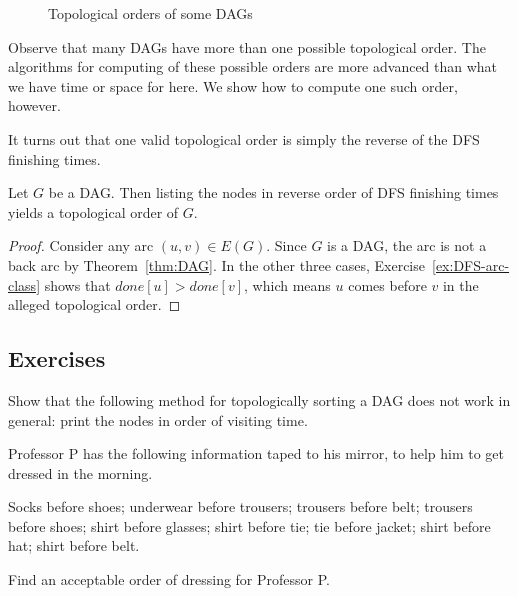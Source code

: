 \begin{figure}

\label{fig:toporder}



\centerline{}

\caption{Topological orders of some DAGs}
\end{figure}

Observe that many DAGs have more than one possible topological order. 
The algorithms for computing  of these possible orders are
more advanced than what we have time or space for here. We show how to
compute one such order, however.

It turns out that one valid topological order is simply the reverse of
the DFS finishing times.

\begin{Theorem}
Let $G$ be a DAG. Then listing the nodes in reverse order of DFS
finishing times yields a topological order of $G$.
\end{Theorem}

\begin{proof} 
Consider any arc $(u,v)\in E(G)$. Since $G$ is a DAG,
the arc is not a back arc by Theorem~\ref{thm:DAG}. In the other three
cases, Exercise~\ref{ex:DFS-arc-class} shows that $done[u] > done[v]$,
which means $u$ comes before $v$ in the alleged topological order.

\end{proof}


\subsection*{Exercises}


\begin{Exercise}
\label{ex:sillytopsort}
Show that the following method for topologically sorting a DAG does not work in general: print the nodes in order of visiting time.

\end{Exercise}

\begin{Exercise} 
\label{ex:profP}

Professor P has the following information taped to his mirror, to help
him to get dressed in the morning.

Socks before shoes; underwear before trousers; trousers before belt;
trousers before shoes; shirt before glasses; shirt before tie; tie
before jacket; shirt before hat; shirt before belt.

Find an acceptable order of dressing for Professor P.

\end{Exercise}



